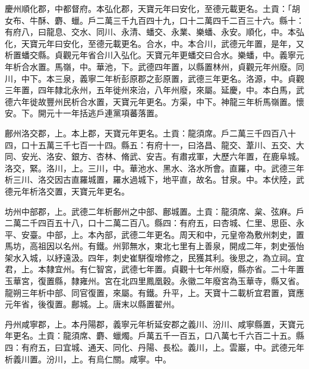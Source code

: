 \begin{pinyinscope}
 慶州順化郡，中都督府。本弘化郡，天寶元年曰安化，至德元載更名。土貢：「胡女布、牛酥、麝、蠟。戶二萬三千九百四十九，口十二萬四千二百三十六。縣十：有府八，曰龍息、交水、同川、永清、蟠交、永業、樂蟠、永安。順化，中。本弘化，天寶元年曰安化，至德元載更名。合水，中。本合川，武德元年置，是年，又析置蟠交縣。貞觀元年省合川入弘化。天寶元年更蟠交曰合水。樂蟠，中。義寧元年析合水置。馬嶺，中。華池，下。武德四年置，以縣置林州，貞觀元年州廢。同川，中下。本三泉，義寧二年析彭原郡之彭原置，武德三年更名。洛源，中。貞觀三年置，四年隸北永州，五年徙州來治，八年州廢，來屬。延慶，中。本白馬，武德六年徙故豐州民析合水置，天寶元年更名。方渠，中下。神龍三年析馬嶺置。懷安。下。開元十一年括逃戶連黨項蕃落置。



 鄜州洛交郡，上。本上郡，天寶元年更名。土貢：龍須席。戶二萬三千四百八十四，口十五萬三千七百一十四。縣五：有府十一，曰洛昌、龍交、葦川、五交、大同、安光、洛安、銀方、杏林、脩武、安吉。有肅戎軍，大歷六年置，在鹿阜城。洛交，緊。洛川，上。三川，中。華池水、黑水、洛水所會。直羅，中。武德三年析三川、洛交因古直羅城置，羅水過城下，地平直，故名。甘泉。中。本伏陸，武德元年析洛交置，天寶元年更名。



 坊州中部郡，上。武德二年析鄜州之中部、鄜城置。土貢：龍須席、枲、弦麻。戶二萬二千四百五十八，口十二萬二百八。縣四：有府五，曰杏城、仁里、思臣、永平、安臺。中部，上。本內部，武德二年更名。周天和中，元皇帝為敷州刺史，置馬坊，高祖因以名州。有鐵。州郭無水，東北七里有上善泉，開成二年，刺史張怡架水入城，以紓遠汲。四年，刺史崔駢復增修之，民獲其利。後思之，為立祠。宜君，上。本隸宜州。有仁智宮，武德七年置。貞觀十七年州廢，縣亦省。二十年置玉華宮，復置縣，隸雍州。宮在北四里鳳凰穀。永徽二年廢宮為玉華寺，縣又省。龍朔三年析中部、同官復置，來屬。有鐵。升平，上。天寶十二載析宜君置，寶應元年省，後復置。鄜城。上。唐末以縣置翟州。



 丹州咸寧郡，上。本丹陽郡，義寧元年析延安郡之義川、汾川、咸寧縣置，天寶元年更名。土貢：龍須席、麝、蠟燭。戶萬五千一百五，口八萬七千六百二十五。縣四：有府五，曰宜城、通天、同化、丹陽、長松。義川，上。雲巖，中。武德元年析義川置。汾川，上。有烏仁關。咸寧。中。




\end{pinyinscope}
